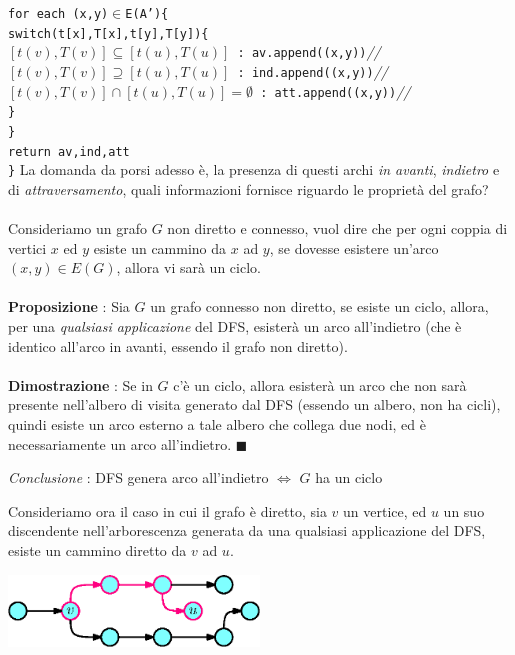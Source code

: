 \documentclass[12pt, letterpaper]{article}
\newcommand{\code}[1]{\colorbox{light-gray}{\texttt{#1}}}
\newcommand{\acc}{\\\hphantom{}\\}
\newcommand{\comm}[1]{\color{lg}\textit{\hphantom{spaz}// \text{#1}}\color{black}}
\begin{document}
{\hphantom{ident}\code{for each (x,y)\(\in\)E(A')\{}\\
\hphantom{ident}\hphantom{ident}\code{switch(t[x],T[x],t[y],T[y])\{}\\
\hphantom{ident}\hphantom{ident}\hphantom{ident}\code{$[t(v),T(v)]\subseteq[t(u),T(u)]$ : av.append((x,y))}\comm{primo caso}\\
\hphantom{ident}\hphantom{ident}\hphantom{ident}\code{$[t(v),T(v)]\supseteq[t(u),T(u)]$ : ind.append((x,y))}\comm{secondo caso}\\
\hphantom{ident}\hphantom{ident}\hphantom{ident}\code{$[t(v),T(v)]\cap[t(u),T(u)]=\emptyset$ : att.append((x,y))}\comm{terzo caso}\\
\hphantom{ident}\hphantom{ident}\code{\}}\\
\hphantom{ident}\code{\}}\\
\hphantom{ident}\code{return av,ind,att}\\
\code{\}}}\newpage
La domanda da porsi adesso è, la presenza di questi archi \textit{in avanti}, \textit{indietro} e di \textit{attraversamento},
quali informazioni fornisce riguardo le proprietà del grafo?\acc Consideriamo un grafo \(G\) non diretto e connesso, vuol dire che per
ogni coppia di vertici \(x\) ed $y$ esiste un cammino da $x$ ad $y$, se dovesse esistere un'arco \((x,y)\in E(G)\), allora
vi sarà un ciclo.\acc
\textbf{Proposizione} : Sia \(G\) un grafo connesso non diretto, se esiste un ciclo, allora, per una
\textit{qualsiasi applicazione} del DFS, esisterà un arco all'indietro (che è identico all'arco in avanti,
essendo il grafo non diretto).\acc
\textbf{Dimostrazione} : Se in \(G\) c'è un ciclo, allora esisterà un arco che non sarà presente nell'albero di visita
generato dal DFS (essendo un albero, non ha cicli), quindi esiste un arco esterno a tale albero che collega due nodi,
ed è necessariamente un arco all'indietro. \(\blacksquare\)
\begin{center}
    \textit{Conclusione} : DFS genera arco all'indietro $\iff$ \(G\) ha un ciclo
\end{center}
Consideriamo ora il caso in cui il grafo è diretto, sia \(v\) un vertice, ed \(u\) un suo discendente nell'arborescenza
generata da una qualsiasi applicazione del DFS, esiste un cammino diretto da \(v\) ad \(u\).\begin{center}
    \includegraphics[width=0.5\textwidth ]{images/discentente.eps}
\end{center}
\end{document}
